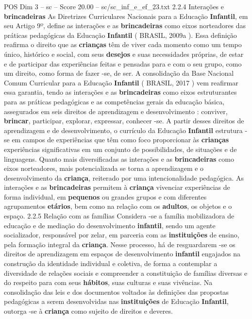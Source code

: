 \begin{textsample}{POS Dim 3 – sc – Score 20.00 – sc/sc\_inf\_e\_ef\_23.txt}  \label{ex:f3_pos_065}
2.2.4 Interações e \textbf{brincadeiras} As Diretrizes Curriculares Nacionais para a Educação \textbf{Infantil}, em seu Artigo 9º, define as interações e as \textbf{brincadeiras} como eixos norteadores das práticas pedagógicas da Educação \textbf{Infantil} ( BRASIL, 2009a ).
Essa definição reafirma o direito que as \textbf{crianças} têm de viver cada momento como um tempo único, histórico e social, com seus \textbf{desejos} e suas necessidades próprias, de estar e de participar das experiências feitas e pensadas para e com o seu grupo, como um direito, como forma de fazer -se, de ser.
A consolidação da Base Nacional Comum Curricular para a Educação \textbf{Infantil} ( BRASIL, 2017 ) vem reafirmar essa garantia, tendo as interações e as \textbf{brincadeiras} como eixos estruturantes para as práticas pedagógicas e as competências gerais da educação básica, assegurados em seis direitos de aprendizagem e desenvolvimento : conviver, \textbf{brincar}, participar, explorar, expressar, conhecer -se.
A partir desses direitos de aprendizagem e de desenvolvimento, o currículo da Educação \textbf{Infantil} estrutura -se em campos de experiências que têm como foco proporcionar às \textbf{crianças} experiências significativas em um conjunto de possibilidades, de situações e de linguagens.
Quanto mais diversificadas as interações e as \textbf{brincadeiras} como eixos norteadores, mais potencializada se torna a aprendizagem e o desenvolvimento da \textbf{criança}, reiterado por uma intencionalidade pedagógica.
As interações e as \textbf{brincadeiras} permitem à \textbf{criança} vivenciar experiências de forma individual, em \textbf{pequenos} ou grandes grupos e com diferentes agrupamentos \textbf{etários}, bem como na relação com os \textbf{adultos}, os objetos e o espaço. 2.2.5 Relação com as famílias Considera -se a família mobilizadora de educação e de mediação do desenvolvimento \textbf{infantil}, sendo um agente socializador, responsável por zelar, em parceria com as \textbf{instituições} de ensino, pela formação integral da \textbf{criança}.
Nesse processo, há de resguardarem -se os direitos de aprendizagem em espaços de desenvolvimento \textbf{infantil} engajados na construção da identidade individual e coletiva, de forma a contemplar a diversidade de relações sociais e compreender a constituição de famílias diversas e do respeito para com seus \textbf{hábitos}, suas culturas e suas vivências.
Na consolidação das leis e dos documentos voltados às definições das propostas pedagógicas a serem desenvolvidas nas \textbf{instituições} de Educação \textbf{Infantil}, outorga -se à \textbf{criança} como sujeito de direitos e deveres.

\end{textsample}
